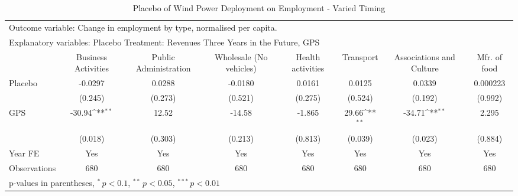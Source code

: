 \begin{table}[htbp]\centering
\def\sym#1{\ifmmode^{#1}\else\(^{#1}\)\fi}
\caption{Placebo of Wind Power Deployment on Employment - Varied Timing \label{employmentplacebo2}}
\begin{tabular*}{\hsize}{@{\hskip\tabcolsep\extracolsep\fill}l*{7}{c}}
\toprule
\multicolumn{7}{l}{\parbox{11cm}{Outcome variable: Change in employment by type, normalised per capita. }} \\ \multicolumn{7}{l}{\parbox{11cm}{Explanatory variables: Placebo Treatment: Revenues Three Years in the Future, GPS}} \\ \midrule & Business Activities & Public Administration & Wholesale (No vehicles) & Health activities & Transport & Associations and Culture & Mfr. of food \\ \midrule
\addlinespace Placebo&     -0.0297         &      0.0288         &     -0.0180         &      0.0161         &      0.0125         &      0.0339         &    0.000223         \\
            &     (0.245)         &     (0.273)         &     (0.521)         &     (0.275)         &     (0.524)         &     (0.192)         &     (0.992)         \\\addlinespace
GPS         &      -30.94\sym{**} &       12.52         &      -14.58         &      -1.865         &       29.66\sym{**} &      -34.71\sym{**} &       2.295         \\
            &     (0.018)         &     (0.303)         &     (0.213)         &     (0.813)         &     (0.039)         &     (0.023)         &     (0.884)         \\\addlinespace
\midrule
\addlinespace Year FE&         Yes         &         Yes         &         Yes         &         Yes         &         Yes         &         Yes         &         Yes         \\
\addlinespace \midrule \addlinespace Observations&         680         &         680         &         680         &         680         &         680         &         680         &         680         \\
\bottomrule
\multicolumn{8}{l}{\footnotesize p-values in parentheses, $^{*}\, p<0.1$, $^{**}\, p<0.05$, $^{***}\, p<0.01$}\\
\end{tabular*}
\end{table}

